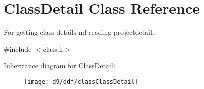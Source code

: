 \hypertarget{classClassDetail}{\section{\-Class\-Detail \-Class \-Reference}
\label{d9/ddf/classClassDetail}
}


\-For getting class details nd reading projectdetail.  




{\ttfamily \#include $<$class.\-h$>$}

\-Inheritance diagram for \-Class\-Detail\-:\begin{figure}[H]
\begin{center}
\leavevmode
\texttt{[image: d9/ddf/classClassDetail]}
\end{center}
\end{figure}
